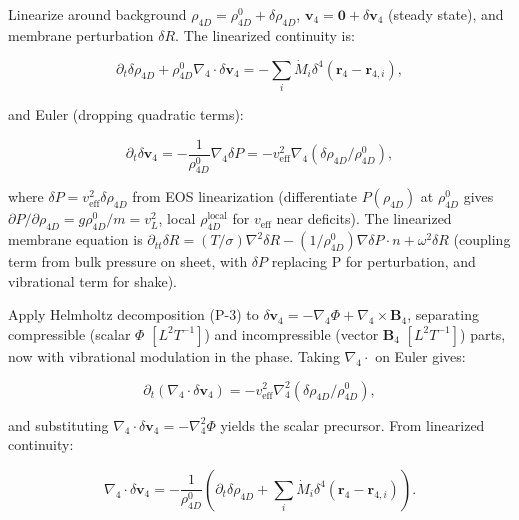 Linearize around background $\rho_{4D} = \rho_{4D}^0 + \delta \rho_{4D}$, $\mathbf{v}_4 = \mathbf{0} + \delta \mathbf{v}_4$ (steady state), and membrane perturbation $\delta R$. The linearized continuity is:

\begin{equation}
\partial_t \delta \rho_{4D} + \rho_{4D}^0 \nabla_4 \cdot \delta \mathbf{v}_4 = -\sum_i \dot{M}_i \delta^4(\mathbf{r}_4 - \mathbf{r}_{4,i}),
\end{equation}

and Euler (dropping quadratic terms):

\begin{equation}
\partial_t \delta \mathbf{v}_4 = -\frac{1}{\rho_{4D}^0} \nabla_4 \delta P = -v_{\text{eff}}^2 \nabla_4 (\delta \rho_{4D} / \rho_{4D}^0),
\end{equation}

where $\delta P = v_{\text{eff}}^2 \delta \rho_{4D}$ from EOS linearization (differentiate $P(\rho_{4D})$ at $\rho_{4D}^0$ gives $\partial P / \partial \rho_{4D} = g \rho_{4D}^0 / m = v_L^2$, local $\rho_{4D}^{\text{local}}$ for $v_{\text{eff}}$ near deficits). The linearized membrane equation is $\partial_{tt} \delta R = (T / \sigma) \nabla^2 \delta R - (1 / \rho_{4D}^0) \nabla \delta P \cdot n + \omega^2 \delta R$ (coupling term from bulk pressure on sheet, with $\delta P$ replacing P for perturbation, and vibrational term for shake).

Apply Helmholtz decomposition (P-3) to $\delta \mathbf{v}_4 = -\nabla_4 \Phi + \nabla_4 \times \mathbf{B}_4$, separating compressible (scalar $\Phi$ $[L^2 T^{-1}]$) and incompressible (vector $\mathbf{B}_4$ $[L^2 T^{-1}]$) parts, now with vibrational modulation in the phase. Taking $\nabla_4 \cdot$ on Euler gives:

\begin{equation}
\partial_t (\nabla_4 \cdot \delta \mathbf{v}_4) = -v_{\text{eff}}^2 \nabla_4^2 (\delta \rho_{4D} / \rho_{4D}^0),
\end{equation}

and substituting $\nabla_4 \cdot \delta \mathbf{v}_4 = -\nabla_4^2 \Phi$ yields the scalar precursor. From linearized continuity:

\begin{equation}
\nabla_4 \cdot \delta \mathbf{v}_4 = -\frac{1}{\rho_{4D}^0} \left( \partial_t \delta \rho_{4D} + \sum_i \dot{M}_i \delta^4(\mathbf{r}_4 - \mathbf{r}_{4,i}) \right).
\end{equation}

